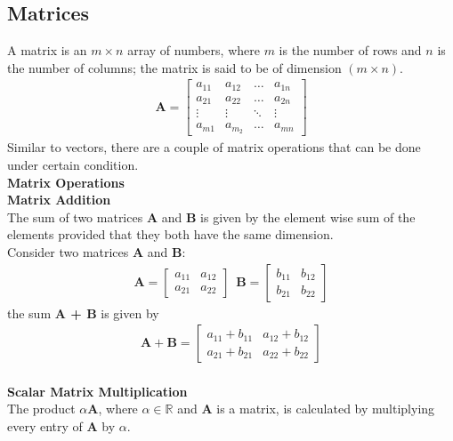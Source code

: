 \subsection{Matrices}
\noindent A matrix is an $m \times n$ array of numbers, where $m$ is the number of rows and $n$ is the number of columns; the matrix is said to be of dimension $(m \times n)$.
\begin{align}
  \textbf{A} = 
  \begin{bmatrix}
    a_{11} & a_{12} & \dots & a_{1n} \\
    a_{21} & a_{22} & \dots & a_{2n} \\
    \vdots & \vdots & \ddots & \vdots \\
    a_{m1} & a_{m_2} & \dots & a_{mn}
  \end{bmatrix}
\end{align}
Similar to vectors, there are a couple of matrix operations that can be done under certain condition. \\
\noindent \textbf{Matrix Operations} \\ 
\noindent \textbf{Matrix Addition} \\
The sum of two matrices $\textbf{A}$ and $\textbf{B}$ is given by the element wise sum of the elements provided that they both have the same dimension. 
\\ Consider two matrices \textbf{A} and \textbf{B}:
\begin{align}
  \textbf{A} =
  \begin{bmatrix}
    a_{11} & a_{12} \\
    a_{21} & a_{22}
  \end{bmatrix} \, \, \, 
  \textbf{B} =
  \begin{bmatrix}
    b_{11} & b_{12} \\
    b_{21} & b_{22}
  \end{bmatrix}
\end{align}
 the sum \textbf{A + B} is given by
\begin{align}
  \textbf{A} + \textbf{B} = \begin{bmatrix}
    a_{11} + b_{11} & a_{12} + b_{12} \\
    a_{21} + b_{21} & a_{22} + b_{22}
  \end{bmatrix}
\end{align}\\
\noindent \textbf{Scalar Matrix Multiplication} \\
The product $\alpha\textbf{A}$, where $\alpha \in \mathbb{R}$ and $\textbf{A}$ is a matrix, is calculated by multiplying every entry of $\textbf{A}$ by $\alpha$. \\
